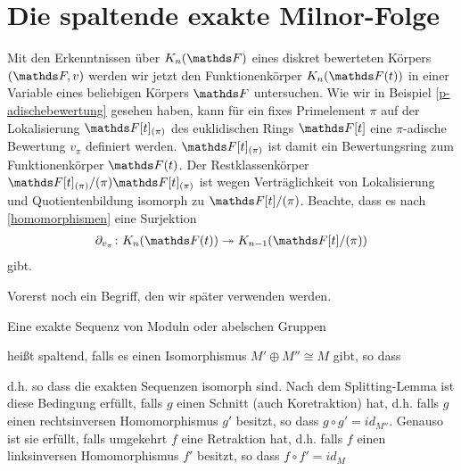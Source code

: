 \documentclass[ngerman,fontsize=11pt, paper=a4, parskip=half, titlepage=true, toc=bib]{scrartcl}
\begin{document}

\section{Die spaltende exakte Milnor-Folge}

Mit den Erkenntnissen über $\KnF$ eines diskret bewerteten 
Körpers $(\F,v)$ werden wir jetzt den Funktionenkörper $\KnFt$ 
in einer Variable eines beliebigen Körpers $\F$ untersuchen. 
Wie wir in Beispiel \ref{p-adischebewertung} gesehen haben, 
kann für ein fixes Primelement $\pi$ auf der Lokalisierung 
$\F[t]_{(\pi)}$ des euklidischen Rings $\F[t]$ eine $\pi$-adische
Bewertung $v_\pi$ definiert werden. $\F[t]_{(\pi)}$ ist damit ein
Bewertungsring zum Funktionenkörper $\Ft $.
Der Restklassenkörper $\F[t]_{(\pi)}/(\pi)\F[t]_{(\pi)}$ ist wegen
Verträglichkeit von Lokalisierung und Quotientenbildung isomorph zu
$\F[t]/(\pi)$.
Beachte, dass es nach \ref{homomorphismen} eine Surjektion
\begin{gather*}
  \partial_{v_\pi}\colon \KnFt\twoheadrightarrow \K_{n-1}(\Ftpi)
\end{gather*}
gibt.

Vorerst noch ein Begriff, den wir später verwenden werden.
\begin{Def}\label{spaltendeexaktesequenz}
  Eine exakte Sequenz von Moduln oder abelschen Gruppen
  \begin{center}
  \end{center}
  heißt spaltend, falls es einen Isomorphismus $M'\oplus M''\cong M$
  gibt, so dass
  \begin{center}
  \end{center}
  d.h. so dass die exakten Sequenzen isomorph sind.
  Nach dem Splitting-Lemma ist diese Bedingung 
  erfüllt, falls $g$ einen Schnitt (auch Koretraktion) hat, 
  d.h. falls $g$ einen rechtsinversen Homomorphismus
  $g'$ besitzt, so dass $g\circ g'=id_{M''}$.
  Genauso ist sie erfüllt, falls umgekehrt $f$ eine Retraktion hat,
  d.h. falls $f$ einen linksinversen Homomorphismus 
  $f'$ besitzt, so dass $f\circ f'=id_{M}$
  \cite[siehe auch][Kap. 1.5]{bosch}
\end{Def}
\end{document}
